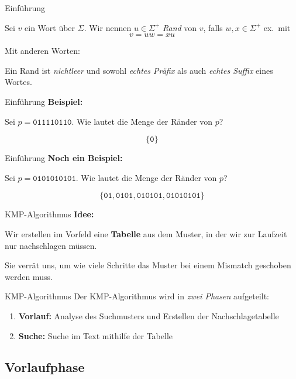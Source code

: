 \documentclass[xcolor=dvipsnames, aspectratio=1610]{beamer}
\begin{document}
\begin{frame}{Einführung}
\begin{defi}
Sei $v$ ein Wort über $\Sigma$. Wir nennen $u\in\Sigma^+$ \textit{Rand} von $v$, falls $w,x\in\Sigma^+$ ex.\ mit \[v=uw=xu\]
\end{defi}
\pause\bigskip
Mit anderen Worten:\smallskip

Ein Rand ist \emph{nichtleer} und sowohl \emph{echtes Präfix} als auch \emph{echtes Suffix} eines Wortes.
\end{frame}

\begin{frame}{Einführung}
\textbf{Beispiel:}\bigskip

Sei $p=\texttt{011110110}$. Wie lautet die Menge der Ränder von $p$?\pause

\[\{\texttt{0}\}\]
\end{frame}

\begin{frame}{Einführung}
\textbf{Noch ein Beispiel:}\bigskip

Sei $p=\texttt{0101010101}$. Wie lautet die Menge der Ränder von $p$?\pause

\[\{\texttt{01},\texttt{0101},\texttt{010101},\texttt{01010101}\}\]
\end{frame}

\begin{frame}{KMP-Algorithmus}
\textbf{Idee:}\medskip

Wir erstellen im Vorfeld eine \textbf{Tabelle} aus dem Muster, in der wir zur Laufzeit nur nachschlagen müssen.\medskip

Sie verrät uns, um wie viele Schritte das Muster bei einem Mismatch geschoben werden muss.
\end{frame}

\begin{frame}{KMP-Algorithmus}
Der KMP-Algorithmus wird in \textit{zwei Phasen} aufgeteilt:\bigskip

\begin{enumerate}[1.]
\item \textbf{Vorlauf:} Analyse des Suchmusters und Erstellen der Nachschlagetabelle
\item \textbf{Suche:} Suche im Text mithilfe der Tabelle
\end{enumerate}
\end{frame}



\subsection{Vorlaufphase}
\end{document}
